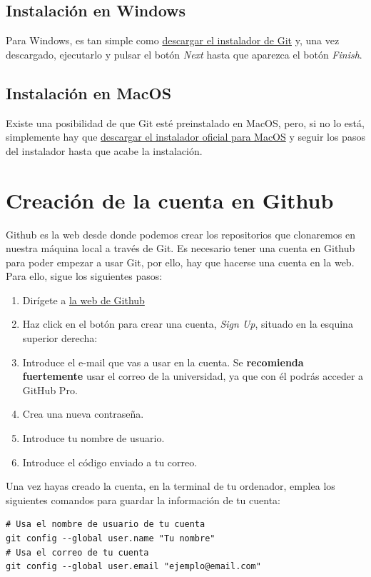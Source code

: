 \documentclass[]{article}
\begin{document}
\subsection{Instalación en Windows}
Para Windows, es tan simple como \textcolor{blue}{\href{https://gitforwindows.org/}{descargar el instalador de Git}} y, una vez descargado, ejecutarlo y pulsar el botón \textit{Next} hasta que aparezca el botón \textit{Finish}.

\subsection{Instalación en MacOS}
Existe una posibilidad de que Git esté preinstalado en MacOS, pero, si no lo está, simplemente hay que \textcolor{blue}{\href{https://sourceforge.net/projects/git-osx-installer/files/}{descargar el instalador oficial para MacOS}} y seguir los pasos del instalador hasta que acabe la instalación. 

\newpage
\section{Creación de la cuenta en Github}
Github es la web desde donde podemos crear los repositorios que clonaremos en nuestra máquina local a través de Git. Es necesario tener una cuenta en Github para poder empezar a usar Git, por ello, hay que hacerse una cuenta en la web. Para ello, sigue los siguientes pasos:

\begin{enumerate}
    \item Dirígete a \textcolor{blue}{\href{https://github.com/}{la web de Github}}
    \item Haz click en el botón para crear una cuenta, \textit{Sign Up}, situado en la esquina superior derecha:
    \item Introduce el e-mail que vas a usar en la cuenta. Se \textbf{recomienda fuertemente} usar el correo de la universidad, ya que con él podrás acceder a GitHub Pro.
    \item Crea una nueva contraseña.
    \item Introduce tu nombre de usuario.
    \item Introduce el código enviado a tu correo.
\end{enumerate}

Una vez hayas creado la cuenta, en la terminal de tu ordenador, emplea los siguientes comandos para guardar la información de tu cuenta:

\begin{lstlisting}
# Usa el nombre de usuario de tu cuenta
git config --global user.name "Tu nombre"
# Usa el correo de tu cuenta
git config --global user.email "ejemplo@email.com"
\end{lstlisting}
\end{document}
